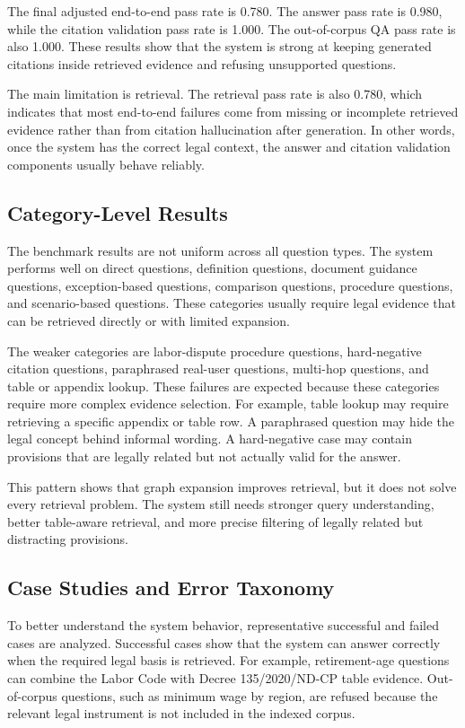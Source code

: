 The final adjusted end-to-end pass rate is 0.780. The answer pass rate is 0.980, while the citation validation pass rate is 1.000. The out-of-corpus QA pass rate is also 1.000. These results show that the system is strong at keeping generated citations inside retrieved evidence and refusing unsupported questions.

The main limitation is retrieval. The retrieval pass rate is also 0.780, which indicates that most end-to-end failures come from missing or incomplete retrieved evidence rather than from citation hallucination after generation. In other words, once the system has the correct legal context, the answer and citation validation components usually behave reliably.

\subsection{Category-Level Results}

The benchmark results are not uniform across all question types. The system performs well on direct questions, definition questions, document guidance questions, exception-based questions, comparison questions, procedure questions, and scenario-based questions. These categories usually require legal evidence that can be retrieved directly or with limited expansion.

The weaker categories are labor-dispute procedure questions, hard-negative citation questions, paraphrased real-user questions, multi-hop questions, and table or appendix lookup. These failures are expected because these categories require more complex evidence selection. For example, table lookup may require retrieving a specific appendix or table row. A paraphrased question may hide the legal concept behind informal wording. A hard-negative case may contain provisions that are legally related but not actually valid for the answer.

This pattern shows that graph expansion improves retrieval, but it does not solve every retrieval problem. The system still needs stronger query understanding, better table-aware retrieval, and more precise filtering of legally related but distracting provisions.

\subsection{Case Studies and Error Taxonomy}

To better understand the system behavior, representative successful and failed cases are analyzed. Successful cases show that the system can answer correctly when the required legal basis is retrieved. For example, retirement-age questions can combine the Labor Code with Decree 135/2020/ND-CP table evidence. Out-of-corpus questions, such as minimum wage by region, are refused because the relevant legal instrument is not included in the indexed corpus.


